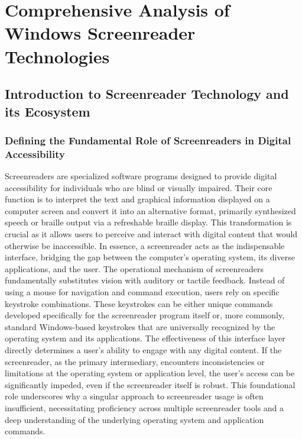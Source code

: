 \chapter{Comprehensive Analysis of Windows Screenreader Technologies}

\section{Introduction to Screenreader Technology and its Ecosystem}

\subsection{Defining the Fundamental Role of Screenreaders in Digital Accessibility}
Screenreaders are specialized software programs designed to provide digital accessibility for individuals who are blind or visually impaired. Their core function is to interpret the text and graphical information displayed on a computer screen and convert it into an alternative format, primarily synthesized speech or braille output via a refreshable braille display.\supercite{kingsbury2025} This transformation is crucial as it allows users to perceive and interact with digital content that would otherwise be inaccessible. In essence, a screenreader acts as the indispensable interface, bridging the gap between the computer's operating system, its diverse applications, and the user.\supercite{kingsbury2025}
The operational mechanism of screenreaders fundamentally substitutes vision with auditory or tactile feedback. Instead of using a mouse for navigation and command execution, users rely on specific keystroke combinations. These keystrokes can be either unique commands developed specifically for the screenreader program itself or, more commonly, standard Windows-based keystrokes that are universally recognized by the operating system and its applications.\supercite{kingsbury2025} The effectiveness of this interface layer directly determines a user's ability to engage with any digital content. If the screenreader, as the primary intermediary, encounters inconsistencies or limitations at the operating system or application level, the user's access can be significantly impeded, even if the screenreader itself is robust. This foundational role underscores why a singular approach to screenreader usage is often insufficient, necessitating proficiency across multiple screenreader tools and a deep understanding of the underlying operating system and application commands.


